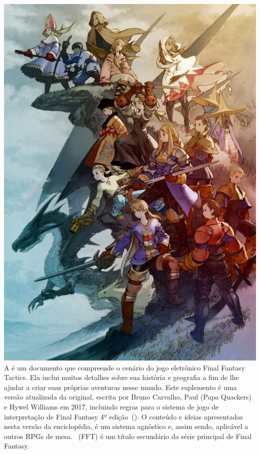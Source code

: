 %
\\\\
%
\includegraphics[width=\columnwidth]{./art/worldbook/everyone.jpg}
%
\ofrow
%
A  é um documento que compreende o cenário do jogo eletrônico Final Fantasy Tactics. 
Ela inclui muitos detalhes sobre sua história e geografia a fim de lhe ajudar a criar suas próprias aventuras nesse mundo.
Este suplemento é uma versão atualizada da original, escrita por Bruno Carvalho, Paul (Papa Quackers) e Hywel Williams em 2017, incluindo regras para o sistema de jogo de interpretação de Final Fantasy 4º edição~().
O conteúdo e ideias apresentadas nesta versão da enciclopédia, é um sistema agnóstico e, assim sendo, aplicável a outros RPGs de mesa.
%
\ofpar
%
~(FFT) é um título secundário da série principal de Final Fantasy. 
